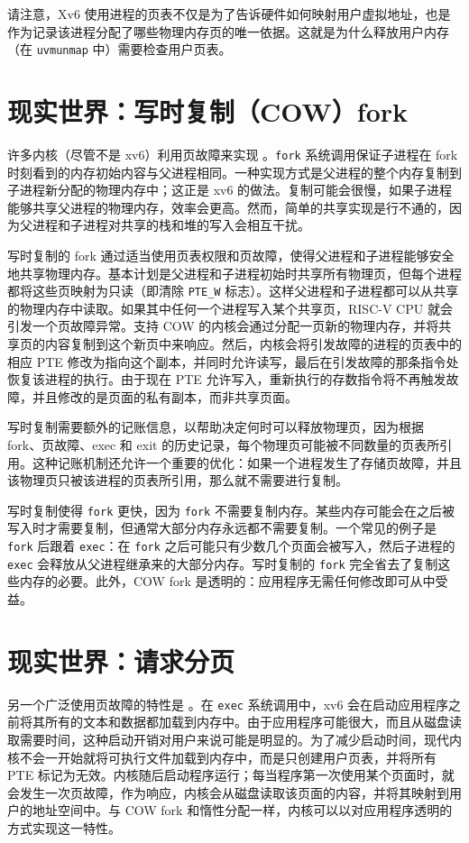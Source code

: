请注意，Xv6 使用进程的页表不仅是为了告诉硬件如何映射用户虚拟地址，也是作为记录该进程分配了哪些物理内存页的唯一依据。这就是为什么释放用户内存（在 {\tt uvmunmap} 中）需要检查用户页表。

\section{现实世界：写时复制（COW）fork}

许多内核（尽管不是 xv6）利用页故障来实现 。{\tt fork} 系统调用保证子进程在 fork 时刻看到的内存初始内容与父进程相同。一种实现方式是父进程的整个内存复制到子进程新分配的物理内存中；这正是 xv6 的做法。复制可能会很慢，如果子进程能够共享父进程的物理内存，效率会更高。然而，简单的共享实现是行不通的，因为父进程和子进程对共享的栈和堆的写入会相互干扰。

写时复制的 fork 通过适当使用页表权限和页故障，使得父进程和子进程能够安全地共享物理内存。基本计划是父进程和子进程初始时共享所有物理页，但每个进程都将这些页映射为只读（即清除 \lstinline{PTE_W} 标志）。这样父进程和子进程都可以从共享的物理内存中读取。如果其中任何一个进程写入某个共享页，RISC-V CPU 就会引发一个页故障异常。支持 COW 的内核会通过分配一页新的物理内存，并将共享页的内容复制到这个新页中来响应。然后，内核会将引发故障的进程的页表中的相应 PTE 修改为指向这个副本，并同时允许读写，最后在引发故障的那条指令处恢复该进程的执行。由于现在 PTE 允许写入，重新执行的存数指令将不再触发故障，并且修改的是页面的私有副本，而非共享页面。

写时复制需要额外的记账信息，以帮助决定何时可以释放物理页，因为根据 fork、页故障、exec 和 exit 的历史记录，每个物理页可能被不同数量的页表所引用。这种记账机制还允许一个重要的优化：如果一个进程发生了存储页故障，并且该物理页只被该进程的页表所引用，那么就不需要进行复制。

写时复制使得 \lstinline{fork} 更快，因为 \lstinline{fork} 不需要复制内存。某些内存可能会在之后被写入时才需要复制，但通常大部分内存永远都不需要复制。一个常见的例子是 \lstinline{fork} 后跟着 \lstinline{exec}：在 \lstinline{fork} 之后可能只有少数几个页面会被写入，然后子进程的 \lstinline{exec} 会释放从父进程继承来的大部分内存。写时复制的 \lstinline{fork} 完全省去了复制这些内存的必要。此外，COW fork 是透明的：应用程序无需任何修改即可从中受益。

\section{现实世界：请求分页}

另一个广泛使用页故障的特性是 。在 \lstinline{exec} 系统调用中，xv6 会在启动应用程序之前将其所有的文本和数据都加载到内存中。由于应用程序可能很大，而且从磁盘读取需要时间，这种启动开销对用户来说可能是明显的。为了减少启动时间，现代内核不会一开始就将可执行文件加载到内存中，而是只创建用户页表，并将所有 PTE 标记为无效。内核随后启动程序运行；每当程序第一次使用某个页面时，就会发生一次页故障，作为响应，内核会从磁盘读取该页面的内容，并将其映射到用户的地址空间中。与 COW fork 和惰性分配一样，内核可以以对应用程序透明的方式实现这一特性。

